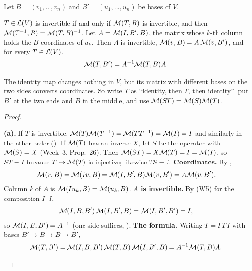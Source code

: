 \documentclass[10pt]{scrartcl}
\begin{document}
\begin{proposition*}
  Let $B=(v_1,\dots,v_n)$ and $B'=(u_1,\dots,u_n)$ be bases of $V$.
  \begin{enumerate}[(a)]
    \ii $T\in\mathcal L(V)$ is invertible if and only if $\mathcal M(T,B)$ is invertible, and then $\mathcal M(T^{-1},B)=\mathcal M(T,B)^{-1}$.
    \ii Let $A=\mathcal M(I,B',B)$, the matrix whose $k$-th column holds the $B$-coordinates of $u_k$. Then $A$ is invertible, $\mathcal M(v,B)=A\,\mathcal M(v,B')$, and for every $T\in\mathcal L(V)$,
    \[
      \mathcal M(T, B') = A^{-1}\mathcal M(T, B)A.
    \]
  \end{enumerate}
\end{proposition*}
\begin{ideabox}
  The identity map changes nothing in $V$, but its matrix with different bases on the two sides converts coordinates. So write $T$ as ``identity, then $T$, then identity'', put $B'$ at the two ends and $B$ in the middle, and use $\mathcal M(ST)=\mathcal M(S)\mathcal M(T)$.
\end{ideabox}
\begin{proof}
  \begin{steps}
    \ii \textbf{(a).} If $T$ is invertible, $\mathcal M(T)\mathcal M(T^{-1})=\mathcal M(TT^{-1})=\mathcal M(I)=I$ and similarly in the other order (). If $\mathcal M(T)$ has an inverse $X$, let $S$ be the operator with $\mathcal M(S)=X$ (Week~3, Prop.~26). Then $\mathcal M(ST)=X\mathcal M(T)=I=\mathcal M(I)$, so $ST=I$ because $T\mapsto\mathcal M(T)$ is injective; likewise $TS=I$.
    \ii \textbf{Coordinates.} By ,
    \[
      \mathcal M(v,B)=\mathcal M(Iv,B)=\mathcal M(I,B',B)\mathcal M(v,B')=A\mathcal M(v,B').
    \] Column $k$ of $A$ is $\mathcal M(Iu_k,B)=\mathcal M(u_k,B)$.
    \ii \textbf{$A$ is invertible.} By (W5) for the composition $I\cdot I$,
    \[
      \mathcal M(I,B,B')\,\mathcal M(I,B',B)=\mathcal M(I,B',B')=I,
    \]
    so $\mathcal M(I,B,B')=A^{-1}$ (one side suffices, ).
    \ii \textbf{The formula.} Writing $T=I\,T\,I$ with bases $B'\to B\to B\to B'$,
    \[
      \mathcal M(T,B')=\mathcal M(I,B,B')\,\mathcal M(T,B)\,\mathcal M(I,B',B)=A^{-1}\mathcal M(T,B)A .
    \]
  \end{steps}
\end{proof}
\end{document}

